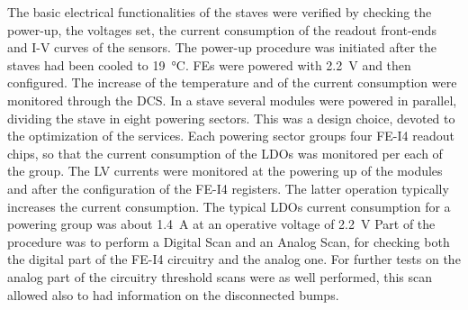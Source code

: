The basic electrical functionalities of the staves were verified by checking the power-up, the voltages set, the current consumption of the readout front-ends and I-V curves of the sensors.
The power-up procedure was initiated after the staves had been cooled to \SI{19}{\celsius}. FEs were powered with \SI{2.2}{\volt} and then configured. The increase of the temperature and of the current consumption were monitored through the DCS.
In a stave several modules were powered in parallel, dividing the stave in eight powering sectors. This was a design choice, devoted to the optimization of the services. Each powering sector groups four FE-I4 readout chips, so that the current consumption of the LDOs was monitored per each of the group. The LV currents were monitored at the powering up of the modules and after the configuration of the FE-I4 registers. The latter operation typically increases the current consumption. The typical LDOs current consumption for a  powering group was about \SI{1.4}{\ampere} at an operative voltage of \SI{2.2}{\volt}
Part of the procedure was to perform a Digital Scan and an Analog Scan, for checking both the digital part of the FE-I4 circuitry and the analog one. For further tests on the analog part of the circuitry threshold scans were as well performed, this scan allowed also to had information on the disconnected bumps. 

